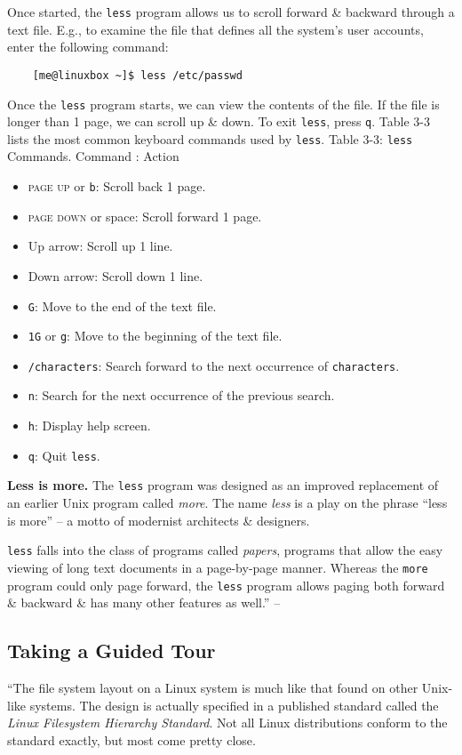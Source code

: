 \documentclass[oneside]{book}
\numberwithin{equation}{section}
\begin{document}
Once started, the \texttt{less} program allows us to scroll forward \& backward through a text file. E.g., to examine the file that defines all the system's user accounts, enter the following command:
\begin{verbatim}
	[me@linuxbox ~]$ less /etc/passwd
\end{verbatim}
Once the \texttt{less} program starts, we can view the contents of the file. If the file is longer than 1 page, we can scroll up \& down. To exit \texttt{less}, press \texttt{q}. Table 3-3 lists the most common keyboard commands used by \texttt{less}. \textsf{Table 3-3: \texttt{less} Commands. Command : Action}
\begin{itemize}
	\item \textsc{page up} or \texttt{b}: Scroll back 1 page.
	\item \textsc{page down} or space: Scroll forward 1 page.
	\item Up arrow: Scroll up 1 line.
	\item Down arrow: Scroll down 1 line.
	\item \texttt{G}: Move to the end of the text file.
	\item \texttt{1G} or \texttt{g}: Move to the beginning of the text file.
	\item \texttt{/characters}: Search forward to the next occurrence of \texttt{characters}.
	\item \texttt{n}: Search for the next occurrence of the previous search.
	\item \texttt{h}: Display help screen.
	\item \texttt{q}: Quit \texttt{less}.
\end{itemize}
\textbf{Less is more.} The \texttt{less} program was designed as an improved replacement of an earlier Unix program called \textit{more}. The name \textit{less} is a play on the phrase ``less is more'' -- a motto of modernist architects \& designers.

\texttt{less} falls into the class of programs called \textit{papers}, programs that allow the easy viewing of long text documents in a page-by-page manner. Whereas the \texttt{more} program could only page forward, the \texttt{less} program allows paging both forward \& backward \& has many other features as well.'' -- \cite[pp. 55--57]{Shotts2019}

\subsection{Taking a Guided Tour}
``The file system layout on a Linux system is much like that found on other Unix-like systems. The design is actually specified in a published standard called the \textit{Linux Filesystem Hierarchy Standard}. Not all Linux distributions conform to the standard exactly, but most come pretty close.
\end{document}
